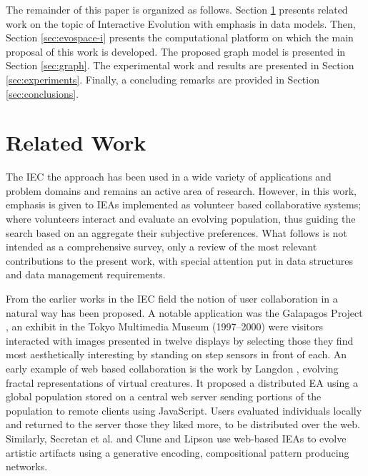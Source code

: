 \documentclass[conference]{IEEEtran}
\begin{document}
The remainder of this paper is organized as follows.
Section \ref{sec:interactive} presents related work on the topic 
of Interactive Evolution with emphasis in data models.
Then, Section \ref{sec:evospace-i} presents the computational platform on which 
the main proposal of this work is developed. The proposed graph model is 
presented in Section \ref{sec:graph}.
The experimental work and results are presented in Section \ref{sec:experiments}.
Finally, a concluding remarks are provided in Section \ref{sec:conclusions}.


\section{Related Work}
\label{sec:interactive}

The IEC the approach has been used in a wide variety of applications and problem domains
and remains an active area of research. However, in this work, emphasis is given to IEAs 
implemented as volunteer based collaborative systems; where volunteers interact and evaluate 
an evolving population, thus guiding the search based on an aggregate their subjective 
preferences. What follows is not intended as a comprehensive survey, only a review of 
the most relevant contributions to the present work, with special attention put in
data structures and data management requirements.

From the earlier works in the IEC field the notion of user collaboration in a natural way
has been proposed. A notable application was the Galapagos Project \cite{sims1997interactivity},
an exhibit in the Tokyo Multimedia Museum (1997--2000) were visitors interacted with images presented in 
twelve displays by selecting those they find most aesthetically interesting by standing on
step sensors in front of each. An early example of web based collaboration is the work by 
Langdon \cite{langdon:2004}, evolving fractal representations of virtual creatures. It proposed a distributed 
EA using a global population stored on a central web server sending 
portions of the population to remote clients using JavaScript. Users evaluated individuals locally 
and returned to the server those they liked more, to be distributed over the web.
Similarly, Secretan et al. \cite{picbreeder} and Clune and Lipson \cite{forms} use web-based IEAs 
to evolve artistic artifacts using a generative encoding, compositional pattern producing networks.
\end{document}
